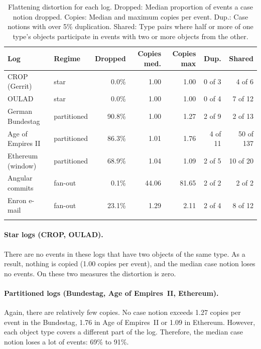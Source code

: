 \documentclass[pdflatex,sn-mathphys-num]{sn-jnl}
\begin{document}
\begin{table}[htbp]
\caption{Flattening distortion for each log. Dropped: Median proportion of events a case notion dropped. Copies: Median and maximum copies per event. Dup.: Case notions with over 5\% duplication. Shared: Type pairs where half or more of one type's objects participate in events with two or more objects from the other.}\label{tab:distortion}
\footnotesize
\setlength{\tabcolsep}{3pt}
\begin{tabular*}{\textwidth}{@{\extracolsep\fill}llrrrrr}
\toprule
Log & Regime & Dropped & Copies med. & Copies max & Dup. & Shared \\
\midrule
CROP (Gerrit) & star & 0.0\% & 1.00 & 1.00 & 0 of 3 & 4 of 6 \\
OULAD & star & 0.0\% & 1.00 & 1.00 & 0 of 4 & 7 of 12 \\
German Bundestag & partitioned & 90.8\% & 1.00 & 1.27 & 2 of 9 & 2 of 13 \\
Age of Empires II & partitioned & 86.3\% & 1.01 & 1.76 & 4 of 11 & 50 of 137 \\
Ethereum (window) & partitioned & 68.9\% & 1.04 & 1.09 & 2 of 5 & 10 of 20 \\
Angular commits & fan-out & 0.1\% & 44.06 & 81.65 & 2 of 2 & 2 of 2 \\
Enron e-mail & fan-out & 23.1\% & 1.29 & 2.11 & 2 of 4 & 8 of 12 \\
\botrule
\end{tabular*}
\end{table}

\paragraph{Star logs (CROP, OULAD).} There are no events in these logs that have two objects of the same type. As a result, nothing is copied (1.00 copies per event), and the median case notion loses no events. On these two measures the distortion is zero.

\paragraph{Partitioned logs (Bundestag, Age of Empires~II, Ethereum).} Again, there are relatively few copies. No case notion exceeds 1.27 copies per event in the Bundestag, 1.76 in Age of Empires~II or 1.09 in Ethereum. However, each object type covers a different part of the log. Therefore, the median case notion loses a lot of events: 69\% to 91\%.
\end{document}
